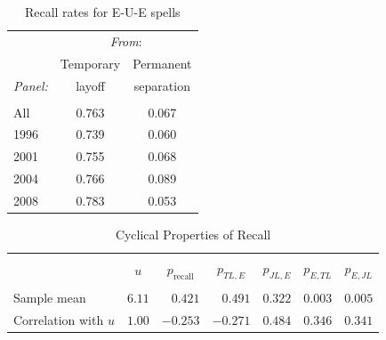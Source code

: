 \documentclass[12pt]{article}
\begin{document}

    \begin{table}
      \caption{Recall rates for E-U-E spells}
      \begin{center}
\begin{tabular}{l|cc}
  \hline \hline
   & \multicolumn{2}{c}{\textit{From}:} \\[0.35em]
                                     &\multicolumn{1}{c}{Temporary} & \multicolumn{1}{c}{Permanent} \\
   \textit{Panel:}                                  
                                     &\multicolumn{1}{c}{layoff} & 
                                     \multicolumn{1}{c}{separation} 
                                     \\[0.35em]
                                     \hline \\[-1em]
  All  & 0.763 & 0.067 \\[.35em]
  1996 & 0.739 & 0.060 \\[.35em]
  2001 & 0.755 & 0.068 \\[.35em]
  2004 & 0.766 & 0.089 \\[.35em]
  2008 & 0.783 & 0.053 \\[.35em]
               \hline
\end{tabular}
      \end{center}
    \end{table}

    \begin{table}
      \caption{Cyclical Properties of Recall}
      \begin{center}
    \begin{tabular}{l|rrrrrr}
      \hline
      \hline \\ [-1em] 
      & \multicolumn{1}{c}{$u$} & \multicolumn{1}{c}{$p_{\text{recall}}$} & \multicolumn{1}{c}{$p_{TL,E}$} & \multicolumn{1}{c}{$p_{JL,E}$} & \multicolumn{1}{c}{$p_{E,TL}$} & \multicolumn{1}{c}{$p_{E,JL}$} \\[0.35em]  
      \hline \\[-1em]
      Sample mean                 & $6.11$ & $0.421 $ & $0.491 $ & $0.322$ & $0.003$ & $0.005$ \\[.35em]
      Correlation with $u$ & $1.00$ & $-0.253$ & $-0.271$ & $0.484$ & $0.346$ & $0.341$ \\[.35em]
      \hline
      \hline
    \end{tabular}
      \end{center}
  \end{table}
\end{document}
